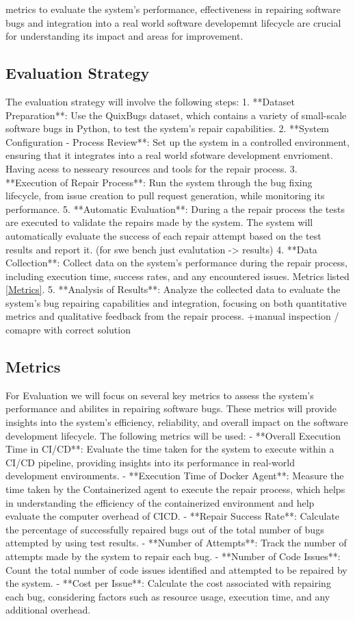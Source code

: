 metrics to evaluate the system's performance, effectiveness in repairing software bugs and integration into a real world software developemnt lifecycle are crucial for understanding its impact and areas for improvement. 

\subsection{Evaluation Strategy}
The evaluation strategy will involve the following steps:
1. **Dataset Preparation**: Use the QuixBugs dataset, which contains a variety of small-scale software bugs in Python, to test the system's repair capabilities.
2. **System Configuration - Process Review**: Set up the system in a controlled environment, ensuring that it integrates into a real world sfotware development envrioment. Having acess to nesseary resources and tools for the repair process.
3. **Execution of Repair Process**: Run the system through the bug fixing lifecycle, from issue creation to pull request generation, while monitoring its performance.
5. **Automatic Evaluation**: During a the repair process the tests are executed to validate the repairs made by the system. The system will automatically evaluate the success of each repair attempt based on the test results and report it. (for swe bench just evalutation -> results)
4. **Data Collection**: Collect data on the system's performance during the repair process, including execution time, success rates, and any encountered issues. Metrics listed \ref{Metrics}.
5. **Analysis of Results**: Analyze the collected data to evaluate the system's bug repairing capabilities and integration, focusing on both quantitative metrics and qualitative feedback from the repair process. +manual inspection / comapre with correct solution
\subsection{Metrics}
For Evaluation we will focus on several key metrics to assess the system's performance and abilites in repairing software bugs. These metrics will provide insights into the system's efficiency, reliability, and overall impact on the software development lifecycle. The following metrics will be used:
- **Overall Execution Time in CI/CD**: Evaluate the time taken for the system to execute within a CI/CD pipeline, providing insights into its performance in real-world development environments.
- **Execution Time of Docker Agent**: Measure the time taken by the Containerized agent to execute the repair process, which helps in understanding the efficiency of the containerized environment and help evaluate the computer overhead of CICD.
- **Repair Success Rate**: Calculate the percentage of successfully repaired bugs out of the total number of bugs attempted by using test results.
- **Number of Attempts**: Track the number of attempts made by the system to repair each bug.
- **Number of Code Issues**: Count the total number of code issues identified and attempted to be repaired by the system.
- **Cost per Issue**: Calculate the cost associated with repairing each bug, considering factors such as resource usage, execution time, and any additional overhead.



